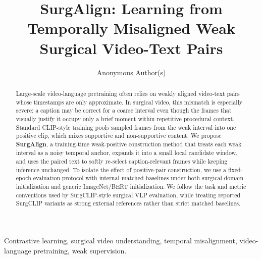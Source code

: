 \documentclass[journal]{IEEEtran}
\title{SurgAlign: Learning from Temporally Misaligned Weak Surgical Video-Text Pairs}
\author{Anonymous Author(s)}
\begin{document}
\maketitle

\begin{abstract}
Large-scale video-language pretraining often relies on weakly aligned video-text pairs whose timestamps are only approximate. In surgical video, this mismatch is especially severe: a caption may be correct for a coarse interval even though the frames that visually justify it occupy only a brief moment within repetitive procedural context. Standard CLIP-style training pools sampled frames from the weak interval into one positive clip, which mixes supportive and non-supportive content. We propose \textbf{SurgAlign}, a training-time weak-positive construction method that treats each weak interval as a noisy temporal anchor, expands it into a small local candidate window, and uses the paired text to softly re-select caption-relevant frames while keeping inference unchanged. To isolate the effect of positive-pair construction, we use a fixed-epoch evaluation protocol with internal matched baselines under both surgical-domain initialization and generic ImageNet/BERT initialization. We follow the task and metric conventions used by SurgCLIP-style surgical VLP evaluation, while treating reported SurgCLIP variants as strong external references rather than strict matched baselines.
\end{abstract}

\begin{IEEEkeywords}
Contrastive learning, surgical video understanding, temporal misalignment, video-language pretraining, weak supervision.
\end{IEEEkeywords}















\end{document}
